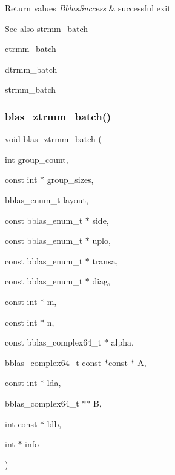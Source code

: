 \begin{DoxyRetVals}{Return values}
{\em Bblas\+Success} & successful exit\\
\hline
\end{DoxyRetVals}
\begin{DoxySeeAlso}{See also}
strmm\+\_\+batch 

ctrmm\+\_\+batch 

dtrmm\+\_\+batch 

strmm\+\_\+batch 
\end{DoxySeeAlso}
\mbox{\label{group__trmm__batch_ga86c0ac5ca43a5fe047386a17dae5c55f}} 
\subsubsection{\texorpdfstring{blas\+\_\+ztrmm\+\_\+batch()}{blas\_ztrmm\_batch()}}
{\footnotesize\ttfamily void blas\+\_\+ztrmm\+\_\+batch (\begin{DoxyParamCaption}\item[{int}]{group\+\_\+count,  }\item[{const int $\ast$}]{group\+\_\+sizes,  }\item[{bblas\+\_\+enum\+\_\+t}]{layout,  }\item[{const bblas\+\_\+enum\+\_\+t $\ast$}]{side,  }\item[{const bblas\+\_\+enum\+\_\+t $\ast$}]{uplo,  }\item[{const bblas\+\_\+enum\+\_\+t $\ast$}]{transa,  }\item[{const bblas\+\_\+enum\+\_\+t $\ast$}]{diag,  }\item[{const int $\ast$}]{m,  }\item[{const int $\ast$}]{n,  }\item[{const bblas\+\_\+complex64\+\_\+t $\ast$}]{alpha,  }\item[{bblas\+\_\+complex64\+\_\+t const $\ast$const $\ast$}]{A,  }\item[{const int $\ast$}]{lda,  }\item[{bblas\+\_\+complex64\+\_\+t $\ast$$\ast$}]{B,  }\item[{int const $\ast$}]{ldb,  }\item[{int $\ast$}]{info }\end{DoxyParamCaption})}

